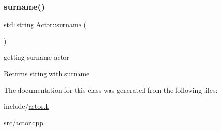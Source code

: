 \subsubsection{\texorpdfstring{surname()}{surname()}}
{\footnotesize\ttfamily std\+::string Actor\+::surname (\begin{DoxyParamCaption}{ }\end{DoxyParamCaption})}



getting surname actor 

\begin{DoxyReturn}{Returns}
string with surname 
\end{DoxyReturn}


The documentation for this class was generated from the following files\+:\begin{DoxyCompactItemize}
\item 
include/\hyperlink{actor_8h}{actor.\+h}\item 
src/actor.\+cpp\end{DoxyCompactItemize}
